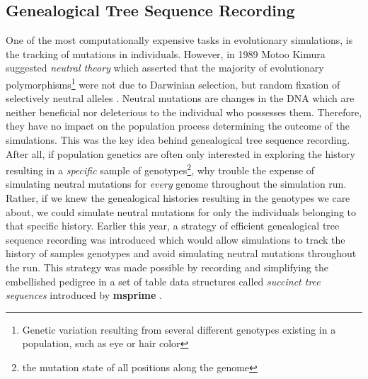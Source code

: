 \documentclass{article}
\begin{document}
\subsection{Genealogical Tree Sequence Recording}

One of the most computationally expensive tasks in evolutionary simulations,
is the tracking of mutations in individuals.
However, in 1989 Motoo Kimura  suggested \textit{neutral theory} 
which asserted that the majority of evolutionary
polymorphisms\footnote{Genetic variation resulting from several different genotypes existing in a population, such as eye or hair color}
were not due to Darwinian selection, but random fixation of selectively neutral alleles \cite{Kimura1989}.
Neutral mutations are changes in the DNA
which are neither beneficial nor deleterious to the individual who possesses them.
Therefore, they have no impact on the population process determining the outcome of the simulations. 
This was the key idea behind genealogical tree sequence recording.
After all, if population genetics are often only interested in exploring the history resulting in a \textit{specific} sample of 
genotypes\footnote{the mutation state of all positions along the genome}, 
why trouble the expense of simulating neutral mutations for \textit{every} genome throughout the simulation run.
Rather, if we knew the genealogical histories resulting in the genotypes we care about,
we could simulate neutral mutations for only the individuals belonging to that specific history.
Earlier this year, a strategy of efficient genealogical tree sequence recording was
introduced which would allow simulations to track the history of samples genotypes 
and avoid simulating neutral mutations throughout the run.
This strategy was made possible by recording and simplifying the embellished pedigree in a set of table data structures 
called \textit{succinct tree sequences} introduced by \textbf{msprime} \cite{Kelleher2016}. 
\end{document}
